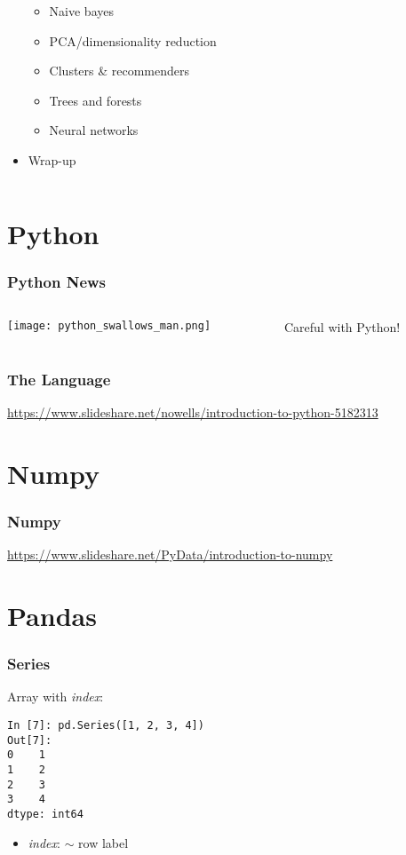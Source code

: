 \documentclass[mathserif, xcolor=table, svgnames]{beamer}
\begin{document}
\begin{frame}
\begin{columns}
\begin{column}{0.5\linewidth}
\begin{itemize}
      \begin{itemize}
      \item Naive bayes
      \item PCA/dimensionality reduction
      \item Clusters \& recommenders
      \item Trees and forests
      \item Neural networks
      \end{itemize}
    \item Wrap-up
    \end{itemize}
  \end{column}
\end{columns}
\end{frame}

\section{Python}

\begin{frame}
  \frametitle{Python News}
  \begin{columns}[T]
    \begin{column}{0.6\linewidth}
        \texttt{[image: python\_swallows\_man.png]}
    \end{column}
    \begin{column}{0.4\linewidth}
      Careful with Python!
    \end{column}
  \end{columns}
\end{frame}

\begin{frame}
  \frametitle{The Language}
  \url{https://www.slideshare.net/nowells/introduction-to-python-5182313}
\end{frame}

\section{Numpy}

\begin{frame}
  \frametitle{Numpy}
  \url{https://www.slideshare.net/PyData/introduction-to-numpy}
\end{frame}

\section{Pandas}

\begin{frame}[fragile]
  \frametitle{Series}
  Array with \emph{index}:
\begin{lstlisting}
In [7]: pd.Series([1, 2, 3, 4])
Out[7]: 
0    1
1    2
2    3
3    4
dtype: int64
\end{lstlisting}
  \begin{itemize}
  \item \emph{index}: $\sim$ row label
  \end{itemize}
\end{frame}
\end{document}
